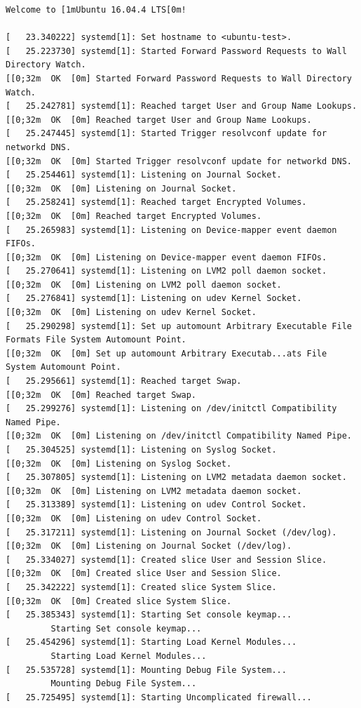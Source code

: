 \documentclass[12pt]{article}
\begin{document}
\begin{verbatim}
Welcome to [1mUbuntu 16.04.4 LTS[0m!

[   23.340222] systemd[1]: Set hostname to <ubuntu-test>.
[   25.223730] systemd[1]: Started Forward Password Requests to Wall Directory Watch.
[[0;32m  OK  [0m] Started Forward Password Requests to Wall Directory Watch.
[   25.242781] systemd[1]: Reached target User and Group Name Lookups.
[[0;32m  OK  [0m] Reached target User and Group Name Lookups.
[   25.247445] systemd[1]: Started Trigger resolvconf update for networkd DNS.
[[0;32m  OK  [0m] Started Trigger resolvconf update for networkd DNS.
[   25.254461] systemd[1]: Listening on Journal Socket.
[[0;32m  OK  [0m] Listening on Journal Socket.
[   25.258241] systemd[1]: Reached target Encrypted Volumes.
[[0;32m  OK  [0m] Reached target Encrypted Volumes.
[   25.265983] systemd[1]: Listening on Device-mapper event daemon FIFOs.
[[0;32m  OK  [0m] Listening on Device-mapper event daemon FIFOs.
[   25.270641] systemd[1]: Listening on LVM2 poll daemon socket.
[[0;32m  OK  [0m] Listening on LVM2 poll daemon socket.
[   25.276841] systemd[1]: Listening on udev Kernel Socket.
[[0;32m  OK  [0m] Listening on udev Kernel Socket.
[   25.290298] systemd[1]: Set up automount Arbitrary Executable File Formats File System Automount Point.
[[0;32m  OK  [0m] Set up automount Arbitrary Executab...ats File System Automount Point.
[   25.295661] systemd[1]: Reached target Swap.
[[0;32m  OK  [0m] Reached target Swap.
[   25.299276] systemd[1]: Listening on /dev/initctl Compatibility Named Pipe.
[[0;32m  OK  [0m] Listening on /dev/initctl Compatibility Named Pipe.
[   25.304525] systemd[1]: Listening on Syslog Socket.
[[0;32m  OK  [0m] Listening on Syslog Socket.
[   25.307805] systemd[1]: Listening on LVM2 metadata daemon socket.
[[0;32m  OK  [0m] Listening on LVM2 metadata daemon socket.
[   25.313389] systemd[1]: Listening on udev Control Socket.
[[0;32m  OK  [0m] Listening on udev Control Socket.
[   25.317211] systemd[1]: Listening on Journal Socket (/dev/log).
[[0;32m  OK  [0m] Listening on Journal Socket (/dev/log).
[   25.334027] systemd[1]: Created slice User and Session Slice.
[[0;32m  OK  [0m] Created slice User and Session Slice.
[   25.342222] systemd[1]: Created slice System Slice.
[[0;32m  OK  [0m] Created slice System Slice.
[   25.385343] systemd[1]: Starting Set console keymap...
         Starting Set console keymap...
[   25.454296] systemd[1]: Starting Load Kernel Modules...
         Starting Load Kernel Modules...
[   25.535728] systemd[1]: Mounting Debug File System...
         Mounting Debug File System...
[   25.725495] systemd[1]: Starting Uncomplicated firewall...

\end{verbatim}
\end{document}
